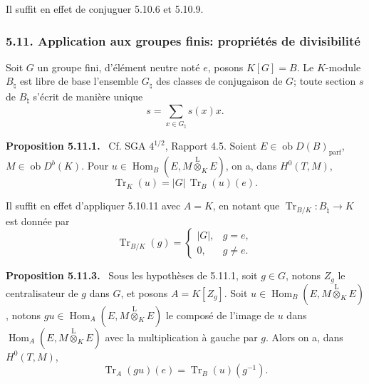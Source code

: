 \documentclass[11pt]{article}
\newenvironment{statement}[1]{\par\medskip\noindent\textbf{#1.}\ }{\par\medskip}
\DeclareMathOperator{\Hom}{Hom}
\newcommand{\ob}{\operatorname{ob}}
\providecommand{\Tr}{\operatorname{Tr}}
\providecommand{\Tr}{\operatorname{Tr}}
\providecommand{\lten}{\overset{\mathrm L}{\otimes}}
\providecommand{\Tr}{\operatorname{Tr}}
\providecommand{\Hom}{\operatorname{Hom}}
\providecommand{\ob}{\operatorname{ob}}
\providecommand{\lten}{\overset{\mathrm L}{\otimes}}
\providecommand{\lten}{\overset{\mathrm L}{\otimes}}
\providecommand{\Tr}{\operatorname{Tr}}
\providecommand{\lten}{\overset{\mathrm L}{\otimes}}
\providecommand{\lten}{\overset{\mathrm L}{\otimes}}
\providecommand{\lten}{\overset{\mathrm L}{\otimes}}
\begin{document}
Il suffit en effet de conjuguer 5.10.6 et 5.10.9.

\subsubsection*{5.11. Application aux groupes finis: propriétés de divisibilité}

Soit $G$ un groupe fini, d'élément neutre noté $e$, posons $K[G]=B$. Le $K$-module $B_\natural$ est libre de base l'ensemble $G_\natural$ des classes de conjugaison de $G$; toute section $s$ de $B_\natural$ s'écrit de manière unique
\[
s=\sum_{x\in G_\natural}s(x)x.
\]

\begin{statement}{Proposition 5.11.1}
Cf. SGA $4^{1/2}$, Rapport 4.5. Soient $E\in\ob D(B)_{\mathrm{parf}}$, $M\in\ob D^b(K)$. Pour $u\in\Hom_B(E,M\lten_KE)$, on a, dans $H^0(T,M)$,
\begin{equation}\tag{5.11.1}
\Tr_K(u)=|G|\,\Tr_B(u)(e).
\end{equation}
\end{statement}

Il suffit en effet d'appliquer 5.10.11 avec $A=K$, en notant que $\Tr_{B/K}:B_\natural\to K$ est donnée par
\begin{equation}\tag{5.11.2}
\Tr_{B/K}(g)=
\begin{cases}
|G|,& g=e,\\
0,& g\ne e.
\end{cases}
\end{equation}

\begin{statement}{Proposition 5.11.3}
Sous les hypothèses de 5.11.1, soit $g\in G$, notons $Z_g$ le centralisateur de $g$ dans $G$, et posons $A=K[Z_g]$. Soit $u\in\Hom_B(E,M\lten_KE)$, notons $gu\in\Hom_A(E,M\lten_KE)$ le composé de l'image de $u$ dans $\Hom_A(E,M\lten_KE)$ avec la multiplication à gauche par $g$. Alors on a, dans $H^0(T,M)$,
\begin{equation}\tag{5.11.4}
\Tr_A(gu)(e)=\Tr_B(u)(g^{-1}).
\end{equation}
\end{statement}
\end{document}
